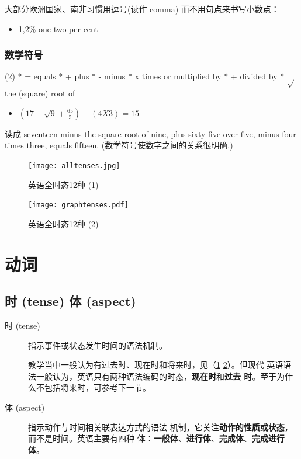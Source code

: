  大部分欧洲国家、南非习惯用逗号(读作 comma) 而不用句点来书写小数点：
 \begin{itemize}
 \item 1,2\% one  two per cent
 \end{itemize}

 \subsection{数学符号}
 \begin{taskitem}(2)
 * = equals
 * + plus
 * - minus
 * x times or multiplied by
 * + divided by
 * $\sqrt{}$ the (square) root of
 \end{taskitem}

 \begin{itemize}
 \item $(17 - \sqrt{9} + \frac{65}{5}) - (4X3) =15$
 \end{itemize}
读成 seventeen minus the square root of nine, plus sixty-five over five,
minus four times three, equals fifteen. (数学符号使数字之间的关系很明确.)

\thispagestyle{empty}
\begin{figure}[p]
  \centering
  \texttt{[image: alltenses.jpg]}
  \caption{\label{fig:alltense}英语全时态12种 (1)}
\end{figure}

\begin{figure}[p]
  \centering
  \texttt{[image: graphtenses.pdf]}
  \caption{\label{fig:graphtense}英语全时态12种 (2)}
\end{figure}
\restoregeometry

\chapter{动词}

\section{时 (tense) 体 (aspect)}
\label{sec:tenseaspect}

\begin{description}
\item[时 (tense)] 指示事件或状态发生时间的语法机制。

  教学当中一般认为有过去时、现在时和将来时，见（\cref{fig:alltense} \cref{fig:graphtense}）。但现代
  英语语法一般认为，英语只有两种语法编码的时态，\textbf{现在时}和\textbf{过去
    时}。至于为什么不包括将来时，可参考下一节。

\item[体 (aspect)]  指示动作与时间相关联表达方式的语法
  机制，它关注\textbf{动作的性质或状态}，而不是时间。英语主要有四种
  体：\textbf{一般体}、\textbf{进行体}、\textbf{完成体}、\textbf{完成进行
    体}。
\end{description}

